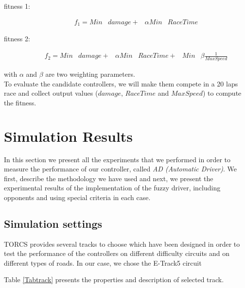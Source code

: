 \documentclass[runningheads,a4paper]{llncs}
\begin{document}
\begin{description}
	\item[fitness 1:]  
	\begin{equation} \label{fit1}
	\begin{array}{lllll}
	f_{1} =  Min & damage + &\alpha  Min & RaceTime 
	\end{array}
	\end{equation}
	\item[fitness 2:] 
	\begin{equation} \label{fit2}
	\begin{array}{llllll}
	f_{2}= Min & damage + &\alpha Min & RaceTime+ & Min & \beta \frac{1}{MaxSpeed}
	\end{array}
	\end{equation}	
\end{description}
with $\alpha$ and $\beta$ are two weighting parameters.\\
To evaluate the candidate controllers, we will make them compete in a 20 laps race and collect output values ($damage$, $RaceTime$ and $MaxSpeed$) to compute the fitness. 
  		
	
	\section{Simulation Results}
	\label{sec:results}
	
	In this section we present all the experiments that we performed in order to measure the performance of our controller, called \textit{AD (Automatic Driver)}.
	We first, describe the methodology we have used and next, we present the experimental results of the implementation of the fuzzy driver, including opponents and using special criteria in each case.
	
	\subsection{Simulation settings}
	
	TORCS provides several tracks to choose which have been designed in order to test the performance of the controllers on different difficulty circuits and on different types of roads.
	In our case, we chose the E-Track5 circuit
	
	
	Table \ref{Tabtrack} presents the properties and description of selected track.
	
\end{document}
